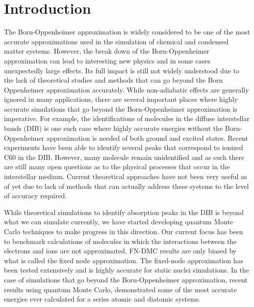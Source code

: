 \documentclass[aip,jcp,numerical,reprint]{revtex4-1}
\begin{document}
\section{Introduction}
The Born-Oppenheimer approximation is widely considered to be one of the most accurate approximations used in the simulation of chemical and condensed matter systems.  However, the break down of the Born-Oppenheimer approximation can lead to interesting new physics and in some cases unexpectedly large effects. Its full impact is still not widely understood due to the lack of theoretical studies and methods that can go beyond the Born Oppenheimer approximation accurately.  While non-adiabatic effects are generally ignored in many applications, there are several important places where highly accurate simulations that go beyond the Born-Oppenheimer approximation is imperative.  For example, the identifications of molecules in the diffuse interstellar bands (DIB) is one such case where highly accurate energies without the Born-Oppenheimer approximation is needed of both ground and excited states.   Recent experiments have been able to identify several peaks that correspond to ionized C60 in the DIB.  However, many molecule remain unidentified and as such there are still many open questions as to the physical processes that occur in the interstellar medium.  Current theoretical approaches have not been very useful as of yet due to lack of methods that can actually address these systems to the level of accuracy required.  

While  theoretical simulations to identify absorption peaks in the DIB is beyond what we can simulate currently, we have started developing quantum Monte Carlo techniques to make progress in this direction.   Our current focus has been to benchmark calculations of molecules in which the interactions between the electrons and ions are not approximated.   FN-DMC results are only biased by what is called the fixed node approximation.  %
The fixed-node approximation has been tested extensively and is highly accurate for static nuclei simulations.  In the case of simulations that go beyond the Born-Oppenheimer approximation, recent results using quantum Monte Carlo, demonstrated some of the most accurate energies ever calculated for a series atomic and diatomic systems.
\end{document}
